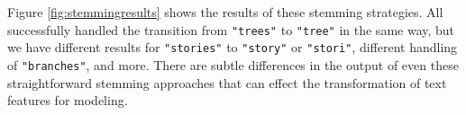 \documentclass[
]{krantz}
\makeatletter
\newenvironment{Shaded}{\begin{snugshade}}{\end{snugshade}}
\newcommand{\AttributeTok}[1]{\textcolor[rgb]{0.77,0.63,0.00}{#1}}
\newcommand{\ConstantTok}[1]{\textcolor[rgb]{0.00,0.00,0.00}{#1}}
\newcommand{\FunctionTok}[1]{\textcolor[rgb]{0.00,0.00,0.00}{#1}}
\newcommand{\NormalTok}[1]{#1}
\newcommand{\OtherTok}[1]{\textcolor[rgb]{0.56,0.35,0.01}{#1}}
\newcommand{\SpecialCharTok}[1]{\textcolor[rgb]{0.00,0.00,0.00}{#1}}
\newcommand{\StringTok}[1]{\textcolor[rgb]{0.31,0.60,0.02}{#1}}
\newenvironment{kframe}{%
\medskip{}
\setlength{\fboxsep}{.8em}
 \def\at@end@of@kframe{}%
 \ifinner\ifhmode%
  \def\at@end@of@kframe{\end{minipage}}%
  \begin{minipage}{\columnwidth}%
 \fi\fi%
 \def\FrameCommand##1{\hskip\@totalleftmargin \hskip-\fboxsep
 \colorbox{shadecolor}{##1}\hskip-\fboxsep
     \hskip-\linewidth \hskip-\@totalleftmargin \hskip\columnwidth}%
 \MakeFramed {\advance\hsize-\width
   \@totalleftmargin\z@ \linewidth\hsize
   \@setminipage}}%
 {\par\unskip\endMakeFramed%
 \at@end@of@kframe}
\renewenvironment{Shaded}{\begin{kframe}}{\end{kframe}}
\makeatother
\begin{document}
\begin{Shaded}
\end{Shaded}

Figure \ref{fig:stemmingresults} shows the results of these stemming strategies. All successfully handled the transition from \texttt{"trees"} to \texttt{"tree"} in the same way, but we have different results for \texttt{"stories"} to \texttt{"story"} or \texttt{"stori"}, different handling of \texttt{"branches"}, and more. There are subtle differences in the output of even these straightforward stemming approaches that can effect the transformation of text features for modeling.
\end{document}
